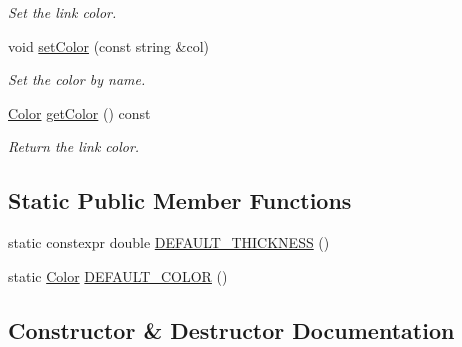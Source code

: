 \begin{DoxyCompactItemize}
\begin{DoxyCompactList}\small\item\em Set the link color. \end{DoxyCompactList}\item 
void \mbox{\hyperlink{classbridges_1_1datastructure_1_1_link_visualizer_af570ade2d50a8789db3b06b79e5dc589}{set\+Color}} (const string \&col)
\begin{DoxyCompactList}\small\item\em Set the color by name. \end{DoxyCompactList}\item 
\mbox{\hyperlink{classbridges_1_1datastructure_1_1_color}{Color}} \mbox{\hyperlink{classbridges_1_1datastructure_1_1_link_visualizer_aeeecf856414fc894b9764e66aef614e1}{get\+Color}} () const
\begin{DoxyCompactList}\small\item\em Return the link color. \end{DoxyCompactList}\end{DoxyCompactItemize}
\subsection*{Static Public Member Functions}
\begin{DoxyCompactItemize}
\item 
static constexpr double \mbox{\hyperlink{classbridges_1_1datastructure_1_1_link_visualizer_a3b23cb9f5ab2dd564fcc4d974e3753f8}{D\+E\+F\+A\+U\+L\+T\+\_\+\+T\+H\+I\+C\+K\+N\+E\+SS}} ()
\item 
static \mbox{\hyperlink{classbridges_1_1datastructure_1_1_color}{Color}} \mbox{\hyperlink{classbridges_1_1datastructure_1_1_link_visualizer_aa42e1a41ab0332c2e50e1a21068b2533}{D\+E\+F\+A\+U\+L\+T\+\_\+\+C\+O\+L\+OR}} ()
\end{DoxyCompactItemize}


\subsection{Constructor \& Destructor Documentation}
\mbox{\label{classbridges_1_1datastructure_1_1_link_visualizer_ae910a1d6f13a3807b025c2c94231d7c8}} 
